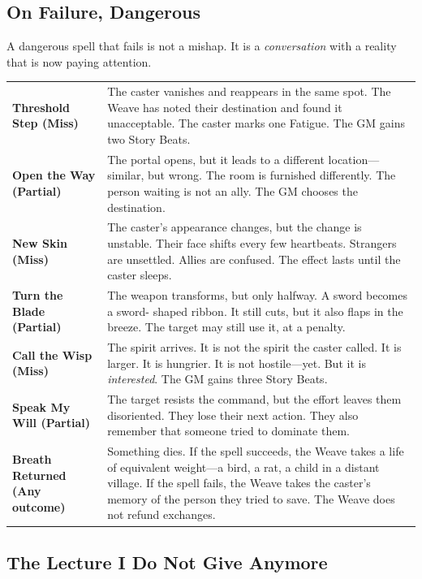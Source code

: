 \subsection{On Failure, Dangerous}

A dangerous spell that fails is not a mishap. It is a \emph{conversation} with a reality that is now paying attention.

\begin{tabular}{p{} p{}}
\textbf{Threshold Step (Miss)} & The caster vanishes and reappears in the same spot. The Weave has noted their destination and found it unacceptable. The caster marks one Fatigue. The GM gains two Story Beats. \\
\textbf{Open the Way (Partial)} & The portal opens, but it leads to a different location---similar, but wrong. The room is furnished differently. The person waiting is not an ally. The GM chooses the destination. \\
\textbf{New Skin (Miss)} & The caster's appearance changes, but the change is unstable. Their face shifts every few heartbeats. Strangers are unsettled. Allies are confused. The effect lasts until the caster sleeps. \\
\textbf{Turn the Blade (Partial)} & The weapon transforms, but only halfway. A sword becomes a sword- shaped ribbon. It still cuts, but it also flaps in the breeze. The target may still use it, at a penalty. \\
\textbf{Call the Wisp (Miss)} & The spirit arrives. It is not the spirit the caster called. It is larger. It is hungrier. It is not hostile---yet. But it is \emph{interested}. The GM gains three Story Beats. \\
\textbf{Speak My Will (Partial)} & The target resists the command, but the effort leaves them disoriented. They lose their next action. They also remember that someone tried to dominate them. \\
\textbf{Breath Returned (Any outcome)} & Something dies. If the spell succeeds, the Weave takes a life of equivalent weight---a bird, a rat, a child in a distant village. If the spell fails, the Weave takes the caster's memory of the person they tried to save. The Weave does not refund exchanges. \\
\end{tabular}

\subsection{The Lecture I Do Not Give Anymore}

